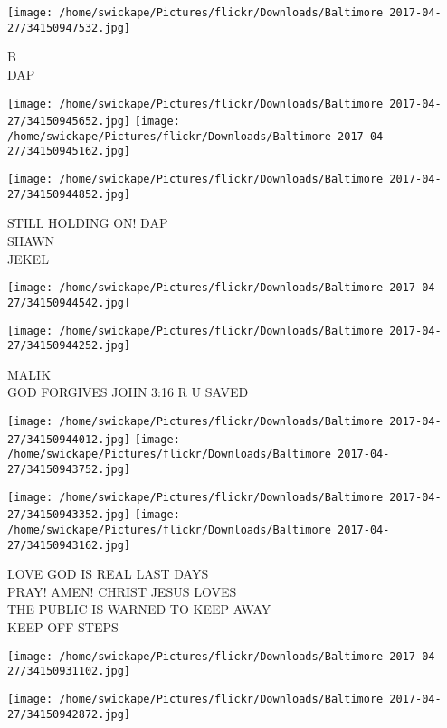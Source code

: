 \documentclass[10pt,letterpaper]{article}
\begin{document}
\vspace{0.25in}
\texttt{[image: /home/swickape/Pictures/flickr/Downloads/Baltimore 2017-04-27/34150947532.jpg]}

B\\
DAP\\
\pagebreak

\texttt{[image: /home/swickape/Pictures/flickr/Downloads/Baltimore 2017-04-27/34150945652.jpg]}
\texttt{[image: /home/swickape/Pictures/flickr/Downloads/Baltimore 2017-04-27/34150945162.jpg]}

\texttt{[image: /home/swickape/Pictures/flickr/Downloads/Baltimore 2017-04-27/34150944852.jpg]}

STILL HOLDING ON!  DAP\\
SHAWN\\
JEKEL\\
\pagebreak

\texttt{[image: /home/swickape/Pictures/flickr/Downloads/Baltimore 2017-04-27/34150944542.jpg]}

\vspace{0.25in}
\texttt{[image: /home/swickape/Pictures/flickr/Downloads/Baltimore 2017-04-27/34150944252.jpg]}

MALIK\\
GOD FORGIVES JOHN 3:16 R U SAVED\\
\pagebreak

\texttt{[image: /home/swickape/Pictures/flickr/Downloads/Baltimore 2017-04-27/34150944012.jpg]}
\texttt{[image: /home/swickape/Pictures/flickr/Downloads/Baltimore 2017-04-27/34150943752.jpg]}

\texttt{[image: /home/swickape/Pictures/flickr/Downloads/Baltimore 2017-04-27/34150943352.jpg]}
\texttt{[image: /home/swickape/Pictures/flickr/Downloads/Baltimore 2017-04-27/34150943162.jpg]}

LOVE GOD IS REAL LAST DAYS\\
PRAY!  AMEN!  CHRIST JESUS LOVES\\
THE PUBLIC IS WARNED TO KEEP AWAY\\
KEEP OFF STEPS\\
\pagebreak

\texttt{[image: /home/swickape/Pictures/flickr/Downloads/Baltimore 2017-04-27/34150931102.jpg]}

\vspace{0.25in}
\texttt{[image: /home/swickape/Pictures/flickr/Downloads/Baltimore 2017-04-27/34150942872.jpg]}
\end{document}
